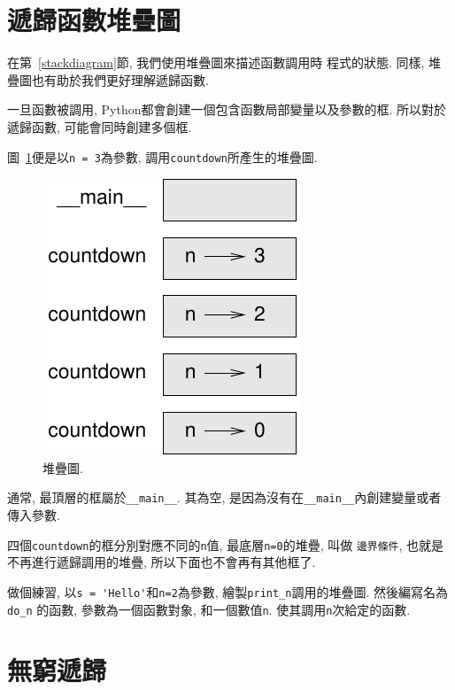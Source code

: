 \documentclass[10pt]{book}
\begin{document}
\section{遞歸函數堆疊圖}
\label{recursive.stack}

在第~\ref{stackdiagram}節, 我們使用堆疊圖來描述函數調用時
程式的狀態. 
同樣, 堆疊圖也有助於我們更好理解遞歸函數. 

一旦函數被調用, Python都會創建一個包含函數局部變量以及參數的框. 
所以對於遞歸函數, 可能會同時創建多個框. 

圖~\ref{fig.stack2}便是以{\tt n = 3}為參數, 調用{\tt countdown}所產生的堆疊圖. 

\begin{figure}
\centerline
{\includegraphics[scale=0.8]{figs/stack2.pdf}}
\caption{堆疊圖.}
\label{fig.stack2}
\end{figure}

通常, 最頂層的框屬於\verb"__main__". 
其為空, 是因為沒有在\verb"__main__"內創建變量或者傳入參數. 

四個{\tt countdown}的框分別對應不同的{\tt n}值, 最底層{\tt n=0}的堆疊, 叫做
{\tt 邊界條件},  也就是不再進行遞歸調用的堆疊, 所以下面也不會再有其他框了. 

做個練習, 以\verb"s = 'Hello'"和{\tt n=2}為參數, 繪製\verb"print_n"調用的堆疊圖. 
然後編寫名為 \verb"do_n" 的函數, 參數為一個函數對象, 和一個數值{\tt n}. 
使其調用{\tt n}次給定的函數. 


\section{無窮遞歸}
\end{document}
